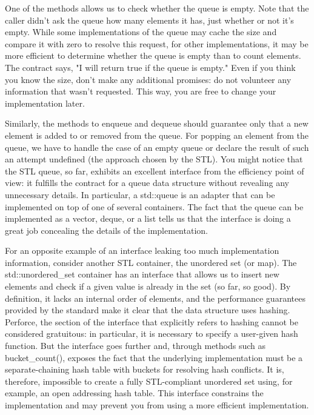 One of the methods allows us to check whether the queue is empty. Note that the caller didn't ask the queue how many elements it has, just whether or not it's empty. While some implementations of the queue may cache the size and compare it with zero to resolve this request, for other implementations, it may be more efficient to determine whether the queue is empty than to count elements. The contract says, "I will return true if the queue is empty." Even if you think you know the size, don't make any additional promises: do not volunteer any information that wasn't requested. This way, you are free to change your implementation later. 

Similarly, the methods to enqueue and dequeue should guarantee only that a new element is added to or removed from the queue. For popping an element from the queue, we have to handle the case of an empty queue or declare the result of such an attempt undefined (the approach chosen by the STL). You might notice that the STL queue, so far, exhibits an excellent interface from the efficiency point of view: it fulfills the contract for a queue data structure without revealing any unnecessary details. In particular, a std::queue is an adapter that can be implemented on top of one of several containers. The fact that the queue can be implemented as a vector, deque, or a list tells us that the interface is doing a great job concealing the details of the implementation.

For an opposite example of an interface leaking too much implementation information, consider another STL container, the unordered set (or map). The std::unordered\_set container has an interface that allows us to insert new elements and check if a given value is already in the set (so far, so good). By definition, it lacks an internal order of elements, and the performance guarantees provided by the standard make it clear that the data structure uses hashing. Perforce, the section of the interface that explicitly refers to hashing cannot be considered gratuitous: in particular, it is necessary to specify a user-given hash function. But the interface goes further and, through methods such as bucket\_count(), exposes the fact that the underlying implementation must be a separate-chaining hash table with buckets for resolving hash conflicts. It is, therefore, impossible to create a fully STL-compliant unordered set using, for example, an open addressing hash table. This interface constrains the implementation and may prevent you from using a more efficient implementation.

